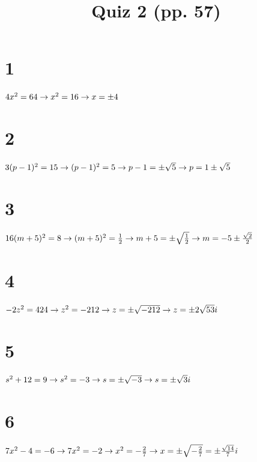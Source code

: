 \documentclass{article}
\title{Quiz 2 (pp. 57)}
\theoremstyle{definition}
\begin{document}
\maketitle

\section*{1}
$4x^2=64\newline\rightarrow x^2=16\newline\rightarrow x=\pm 4$

\section*{2}
$3(p-1)^2=15\newline\rightarrow (p-1)^2=5\newline\rightarrow p-1=\pm\sqrt{5}\newline\rightarrow p=1\pm\sqrt{5}$

\section*{3}
$16(m+5)^2=8\newline\rightarrow (m+5)^2=\frac{1}{2}\newline\rightarrow m+5=\pm\sqrt{\frac{1}{2}}\newline\rightarrow m=-5\pm \frac{\sqrt{2}}{2}$

\section*{4}
$-2z^2=424\newline\rightarrow z^2=-212\newline\rightarrow z=\pm\sqrt{-212}\newline\rightarrow z=\pm 2\sqrt{53}i$

\section*{5}
$s^2+12=9\newline\rightarrow s^2=-3\newline\rightarrow s=\pm\sqrt{-3}\newline\rightarrow s=\pm\sqrt{3}i$

\section*{6}
$7x^2-4=-6\newline\rightarrow 7x^2=-2\newline\rightarrow x^2=-\frac{2}{7}\newline\rightarrow x=\pm\sqrt{-\frac{2}{7}}=\pm\frac{\sqrt{14}}{7}i$
\end{document}
